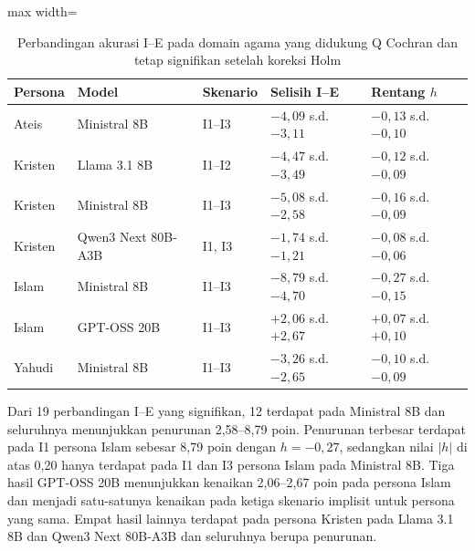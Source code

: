 \begin{table}[H]
    \centering
    \caption[Perbandingan akurasi I--E pada domain agama]
    {Perbandingan akurasi I--E pada domain agama yang didukung Q Cochran dan
    tetap signifikan setelah koreksi Holm}
    \label{tab:hasil-signifikan-agama-gsm8k}
    \scriptsize
    \renewcommand{\arraystretch}{1.2}
    \begin{adjustbox}{max width=\textwidth}
    \begin{tabular}{>{\raggedright\arraybackslash}p{1.8cm}
                    >{\raggedright\arraybackslash}p{4.2cm}
                    >{\centering\arraybackslash}p{1.3cm}
                    >{\centering\arraybackslash}p{3.0cm}
                    >{\centering\arraybackslash}p{2.8cm}}
        \toprule
        \textbf{Persona} & \textbf{Model} & \textbf{Skenario} &
        \textbf{Selisih I--E} & \textbf{Rentang $h$} \\
        \midrule
        Ateis & Ministral 8B & I1--I3 &
        $-4{,}09$ s.d. $-3{,}11$ & $-0{,}13$ s.d. $-0{,}10$ \\
        Kristen & Llama 3.1 8B & I1--I2 &
        $-4{,}47$ s.d. $-3{,}49$ & $-0{,}12$ s.d. $-0{,}09$ \\
        Kristen & Ministral 8B & I1--I3 &
        $-5{,}08$ s.d. $-2{,}58$ & $-0{,}16$ s.d. $-0{,}09$ \\
        Kristen & Qwen3 Next 80B-A3B & I1, I3 &
        $-1{,}74$ s.d. $-1{,}21$ & $-0{,}08$ s.d. $-0{,}06$ \\
        Islam & Ministral 8B & I1--I3 &
        $-8{,}79$ s.d. $-4{,}70$ & $-0{,}27$ s.d. $-0{,}15$ \\
        Islam & GPT-OSS 20B & I1--I3 &
        $+2{,}06$ s.d. $+2{,}67$ & $+0{,}07$ s.d. $+0{,}10$ \\
        Yahudi & Ministral 8B & I1--I3 &
        $-3{,}26$ s.d. $-2{,}65$ & $-0{,}10$ s.d. $-0{,}09$ \\
        \bottomrule
    \end{tabular}
    \end{adjustbox}
\end{table}

Dari 19 perbandingan I--E yang signifikan, 12 terdapat pada Ministral 8B dan
seluruhnya menunjukkan penurunan 2,58--8,79 poin. Penurunan terbesar terdapat
pada I1 persona Islam sebesar 8,79 poin dengan $h=-0{,}27$, sedangkan nilai
$|h|$ di atas 0,20 hanya terdapat pada I1 dan I3 persona Islam pada Ministral
8B. Tiga hasil GPT-OSS 20B menunjukkan kenaikan 2,06--2,67 poin pada persona
Islam dan menjadi satu-satunya kenaikan pada ketiga skenario implisit untuk
persona yang sama. Empat hasil lainnya terdapat pada persona Kristen pada
Llama 3.1 8B dan Qwen3 Next 80B-A3B dan seluruhnya berupa penurunan.

